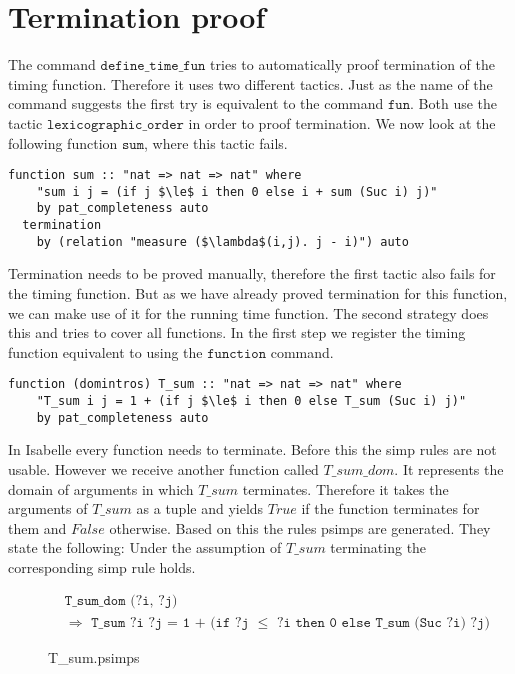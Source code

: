

\section{Termination proof} \label{chapter:termination}

The command $\texttt{define\_time\_fun}$ tries to automatically proof termination of the timing function.
Therefore it uses two different tactics.
Just as the name of the command suggests the first try is equivalent to the command $\texttt{fun}$.
Both use the tactic $\texttt{lexicographic\_order}$ in order to proof termination.
We now look at the following function $\texttt{sum}$, where this tactic fails.
\begin{lstlisting}[language=isabelle,mathescape=true]
  function sum :: "nat => nat => nat" where
    "sum i j = (if j $\le$ i then 0 else i + sum (Suc i) j)"
    by pat_completeness auto
  termination
    by (relation "measure ($\lambda$(i,j). j - i)") auto
\end{lstlisting}

Termination needs to be proved manually, therefore the first tactic also fails for the timing function.
But as we have already proved termination for this function, we can make use of it for the running time function.
The second strategy does this and tries to cover all functions.
In the first step we register the timing function equivalent to using the $\texttt{function}$ command.
\begin{lstlisting}[language=isabelle,mathescape=true,caption=Function registration,label=lst:sum_reg]
  function (domintros) T_sum :: "nat => nat => nat" where
    "T_sum i j = 1 + (if j $\le$ i then 0 else T_sum (Suc i) j)"
    by pat_completeness auto
\end{lstlisting}
In Isabelle every function needs to terminate.
Before this the simp rules are not usable.
However we receive another function called $T\_sum\_dom$.
It represents the domain of arguments in which $T\_sum$ terminates.
Therefore it takes the arguments of $T\_sum$ as a tuple and yields $True$ if the function terminates for them and $False$ otherwise.
Based on this the rules psimps are generated.
They state the following: Under the assumption of $T\_sum$ terminating the corresponding simp rule holds.

\begin{figure}[H]
\begin{align*}
  &\texttt{T\_sum\_dom (?i, ?j)}\\
  &\texttt{$\Longrightarrow$ T\_sum ?i ?j = 1 + (if ?j $\le$ ?i then 0 else T\_sum (Suc ?i) ?j)}
\end{align*}
\caption{T\_sum.psimps}
\end{figure}

